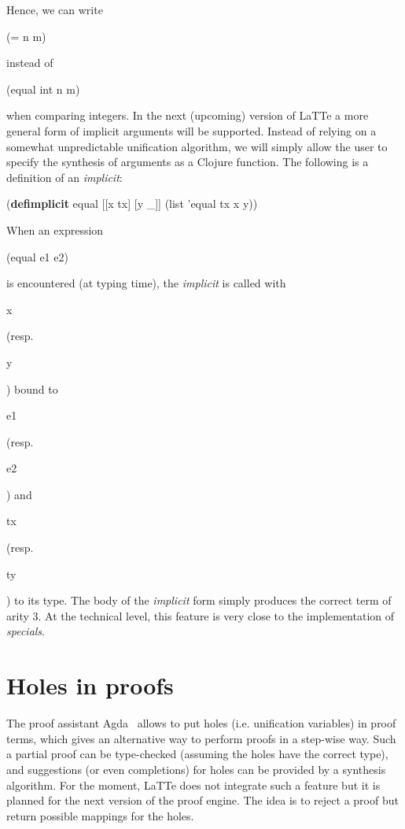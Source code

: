 \documentclass{styles/sig-alternate-05-2015}
\newcommand{\kw}[1]{\textbf{#1}}
\newcommand{\code}[1]{\begin{sffamily}{\small #1}\end{sffamily}}
\begin{document}
Hence, we can write \code{(= n m)} instead of \code{(equal int n m)} when comparing integers.
In the next (upcoming) version of LaTTe a more general form of implicit arguments will be supported. Instead of relying
on a somewhat unpredictable unification algorithm, we will simply allow the user to specify the
synthesis of arguments as a Clojure function. The following is a definition of an \emph{implicit}:

\begin{program}
(\kw{defimplicit} equal [[x tx] [y \_]]
  (list 'equal tx x y))  
\end{program}

When an expression \code{(equal e1 e2)} is encountered (at typing time), the \emph{implicit} is called
with \code{x} (resp. \code{y}) bound to \code{e1} (resp. \code{e2}) and \code{tx} (resp. \code{ty}) to its type.
The body of the \emph{implicit} form simply produces the correct term of arity 3. At the technical level,
 this feature is very close to the implementation of \emph{specials}.

\section*{Holes in proofs} The proof assistant Agda~\cite{agda} allows to put holes
(i.e. unification variables) in proof terms, which gives an alternative way to perform
proofs in a step-wise way. Such a partial proof can be type-checked (assuming the holes have
the correct type), and suggestions (or even completions) for holes can be provided by a
synthesis algorithm. For the moment, LaTTe does not integrate such a feature but it is
planned for the next version of the proof engine. The idea is to reject a proof but return
possible mappings for the holes.
\end{document}
